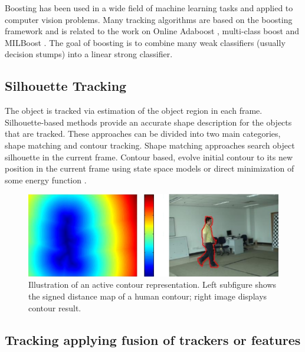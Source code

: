 Boosting has been used in a wide field of machine learning tasks and applied to computer vision problems. Many tracking algorithms are based on the boosting framework \cite{Freund1997a} and is related to the work on Online Adaboost \cite{Avidan2007,Grabner2008,Oza2000}, multi-class boost \cite{Saffari2010} and MILBoost \cite{Babenko2010}. The goal of boosting is to combine many weak classifiers (usually decision stumps) into a linear strong classifier.


\subsection{Silhouette Tracking}

The object is tracked via estimation of the object region in each frame. Silhouette-based methods provide an accurate shape description for the objects that are tracked. These approaches can be divided into two main categories, shape matching and contour tracking. Shape matching \cite{Li2001} approaches search object silhouette in the current frame. Contour based, evolve initial contour to its new position in the current frame using state space models or direct minimization of some energy function \cite{Cremers2003}.

\begin{figure}[h!]
	\centering
		\includegraphics[width=0.9\linewidth]{Figures/contour.png}
	\caption{Illustration of an active contour representation. Left subfigure shows the signed distance map of a human contour; right image displays contour result.}
	\label{fig::contour}
\end{figure}	

\subsection{Tracking applying fusion of trackers or features}

